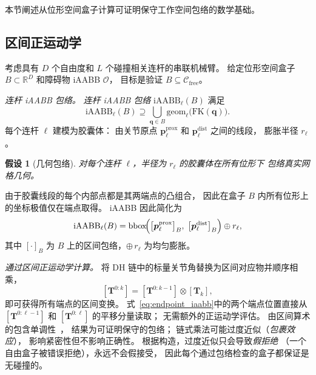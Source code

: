\documentclass[journal]{IEEEtran}
\newtheorem{assumption}{假设}
\newcommand{\Cfree}{\mathcal{C}_\text{free}}
\newcommand{\iAABB}{\text{iAABB}}
\newcommand{\FK}{\text{FK}}
\newcommand{\Real}{\mathbb{R}}
\newcommand{\calO}{\mathcal{O}}
\newcommand{\bT}{\mathbf{T}}
\begin{document}

本节阐述从位形空间盒子计算可证明保守工作空间包络的数学基础。

\subsection{区间正运动学}\label{sec:ifk}

考虑具有 $D$ 个自由度和 $L$ 个碰撞相关连杆的串联机械臂。
给定位形空间盒子 $B \subset \Real^D$ 和障碍物 iAABB $\calO$，
目标是验证 $B \subseteq \Cfree$。

\emph{连杆 iAABB 包络。}
\emph{连杆 iAABB 包络} $\iAABB_\ell(B)$ 满足
\begin{equation}\label{eq:envelope}
  \iAABB_\ell(B) \supseteq \bigcup_{\bm{q} \in B}
    \mathrm{geom}_\ell\bigl(\FK(\bm{q})\bigr).
\end{equation}
每个连杆 $\ell$ 建模为胶囊体：
由关节原点 $\bm{p}_\ell^{\mathrm{prox}}$
和 $\bm{p}_\ell^{\mathrm{dist}}$ 之间的线段，
膨胀半径 $r_\ell$。

\begin{assumption}[几何包络]\label{asm:geom}
对每个连杆 $\ell$，半径为 $r_\ell$ 的胶囊体在所有位形下
包络真实网格几何。
\end{assumption}

由于胶囊线段的每个内部点都是其两端点的凸组合，
因此在盒子 $B$ 内所有位形上的坐标极值仅在端点取得。
iAABB 因此简化为
\begin{equation}\label{eq:endpoint_iaabb}
  \iAABB_\ell(B)
  = \mathrm{bbox}\!\Bigl(
      \bigl[\bm{p}_\ell^{\mathrm{prox}}\bigr]_B,\;
      \bigl[\bm{p}_\ell^{\mathrm{dist}}\bigr]_B
    \Bigr) \oplus r_\ell,
\end{equation}
其中 $[\cdot]_B$ 为 $B$ 上的区间包络，$\oplus\,r_\ell$ 为均匀膨胀。

\emph{通过区间正运动学计算。}
将 DH 链中的标量关节角替换为区间对应物并顺序相乘，
\begin{equation}\label{eq:chain}
  [\bT^{0:k}] = [\bT^{0:k-1}] \otimes [\bT_k],
\end{equation}
即可获得所有端点的区间变换。
式~\eqref{eq:endpoint_iaabb}中的两个端点位置直接从
$[\bT^{0:\ell-1}]$ 和 $[\bT^{0:\ell}]$ 的平移分量读取；
无需额外的正运动学评估。
由区间算术的包含单调性~\cite{moore2009introduction}，
结果为可证明保守的包络；
链式乘法可能过度近似（\emph{包裹效应}），
影响紧密性但不影响正确性。
根据构造，过度近似只会导致\emph{假拒绝}
（一个自由盒子被错误拒绝），永远不会假接受，
因此每个通过包络检查的盒子都保证是无碰撞的。
\end{document}
